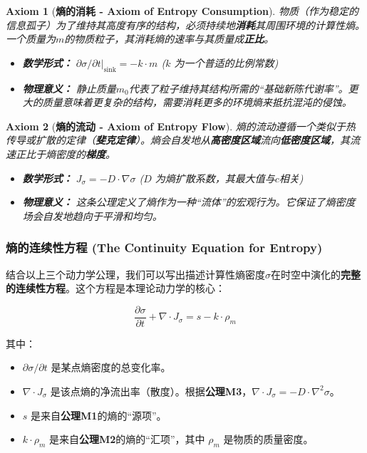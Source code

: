 \documentclass[11pt, a4paper]{article}
\newtheorem{axiom}{Axiom}[section]
\begin{document}
\begin{axiom}[\textbf{熵的消耗 - Axiom of Entropy Consumption}]
物质（作为稳定的信息孤子）为了维持其高度有序的结构，必须持续地\textbf{消耗}其周围环境的计算性熵。一个质量为$m$的物质粒子，其消耗熵的速率与其质量成\textbf{正比}。
\begin{itemize}
    \item \textbf{数学形式：} $\partial\sigma/\partial t |_{\text{sink}} = -k \cdot m$ ($k$ 为一个普适的比例常数)
    \item \textbf{物理意义：} 静止质量$m_0$代表了粒子维持其结构所需的“基础新陈代谢率”。更大的质量意味着更复杂的结构，需要消耗更多的环境熵来抵抗混沌的侵蚀。
\end{itemize}
\end{axiom}

\begin{axiom}[\textbf{熵的流动 - Axiom of Entropy Flow}]
熵的流动遵循一个类似于热传导或扩散的定律（\textbf{斐克定律}）。熵会自发地从\textbf{高密度区域}流向\textbf{低密度区域}，其流速正比于熵密度的\textbf{梯度}。
\begin{itemize}
    \item \textbf{数学形式：} $J_\sigma = -D \cdot \nabla\sigma$ ($D$ 为熵扩散系数，其最大值与$c$相关)
    \item \textbf{物理意义：} 这条公理定义了熵作为一种“流体”的宏观行为。它保证了熵密度场会自发地趋向于平滑和均匀。
\end{itemize}
\end{axiom}

\subsubsection{熵的连续性方程 (The Continuity Equation for Entropy)}

结合以上三个动力学公理，我们可以写出描述计算性熵密度$\sigma$在时空中演化的\textbf{完整的连续性方程}。这个方程是本理论动力学的核心：

\[
\frac{\partial\sigma}{\partial t} + \nabla \cdot J_\sigma = s - k \cdot \rho_m
\]

其中：
\begin{itemize}
    \item $\partial\sigma/\partial t$ 是某点熵密度的总变化率。
    \item $\nabla \cdot J_\sigma$ 是该点熵的净流出率（散度）。根据\textbf{公理M3}，$\nabla \cdot J_\sigma = -D \cdot \nabla^2\sigma$。
    \item $s$ 是来自\textbf{公理M1}的熵的“源项”。
    \item $k \cdot \rho_m$ 是来自\textbf{公理M2}的熵的“汇项”，其中 $\rho_m$ 是物质的质量密度。
\end{itemize}
\end{document}
